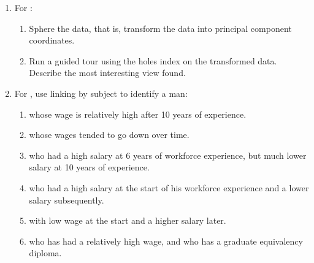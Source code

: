 \begin{enumerate}
\item For :
\begin{enumerate}
\item Sphere the data, that is, transform the data into principal
component coordinates.
\item Run a guided tour using the holes index on the transformed
data. Describe the most interesting view found.
\end{enumerate}
\item For , use linking by subject  to identify a man:
\begin{enumerate}
\item whose wage is relatively high after 10 years of experience.
\item whose wages tended to go down over time.
\item who had a high salary at 6 years of workforce experience, 
but much lower salary at 10 years of experience. %
\item who had a high salary at the start of his workforce 
experience and a lower salary subsequently. %
\item with low wage at the start and a higher salary later. %
\item who has had a relatively high wage, and who has a graduate 
equivalency diploma. %
\end{enumerate}

\end{enumerate}

